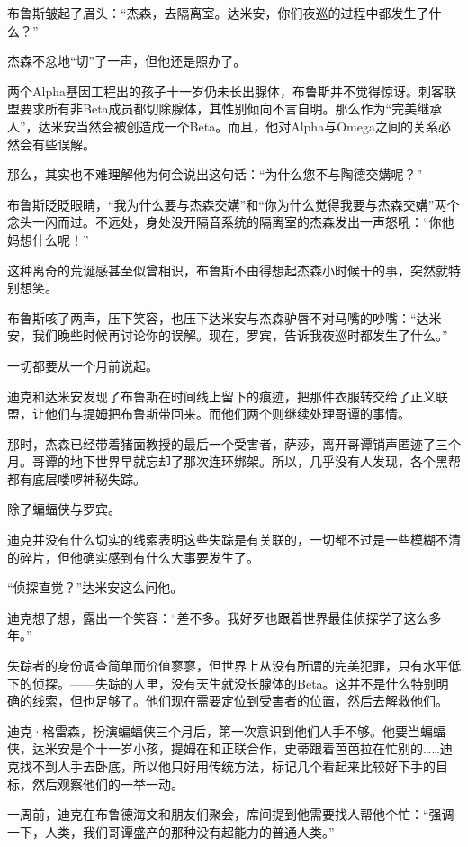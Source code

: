 \documentclass[../main]{subfiles}
\begin{document}
布鲁斯皱起了眉头：“杰森，去隔离室。达米安，你们夜巡的过程中都发生了什么？”

杰森不忿地“切”了一声，但他还是照办了。

两个Alpha基因工程出的孩子十一岁仍未长出腺体，布鲁斯并不觉得惊讶。刺客联盟要求所有非Beta成员都切除腺体，其性别倾向不言自明。那么作为“完美继承人”，达米安当然会被创造成一个Beta。而且，他对Alpha与Omega之间的关系必然会有些误解。

那么，其实也不难理解他为何会说出这句话：“为什么您不与陶德交媾呢？”

布鲁斯眨眨眼睛，“我为什么要与杰森交媾”和“你为什么觉得我要与杰森交媾”两个念头一闪而过。不远处，身处没开隔音系统的隔离室的杰森发出一声怒吼：“你他妈想什么呢！”

这种离奇的荒诞感甚至似曾相识，布鲁斯不由得想起杰森小时候干的事，突然就特别想笑。

布鲁斯咳了两声，压下笑容，也压下达米安与杰森驴唇不对马嘴的吵嘴：“达米安，我们晚些时候再讨论你的误解。现在，罗宾，告诉我夜巡时都发生了什么。”

一切都要从一个月前说起。

迪克和达米安发现了布鲁斯在时间线上留下的痕迹，把那件衣服转交给了正义联盟，让他们与提姆把布鲁斯带回来。而他们两个则继续处理哥谭的事情。

那时，杰森已经带着猪面教授的最后一个受害者，萨莎，离开哥谭销声匿迹了三个月。哥谭的地下世界早就忘却了那次连环绑架。所以，几乎没有人发现，各个黑帮都有底层喽啰神秘失踪。

除了蝙蝠侠与罗宾。

迪克并没有什么切实的线索表明这些失踪是有关联的，一切都不过是一些模糊不清的碎片，但他确实感到有什么大事要发生了。

“侦探直觉？”达米安这么问他。

迪克想了想，露出一个笑容：“差不多。我好歹也跟着世界最佳侦探学了这么多年。”

失踪者的身份调查简单而价值寥寥，但世界上从没有所谓的完美犯罪，只有水平低下的侦探。——失踪的人里，没有天生就没长腺体的Beta。这并不是什么特别明确的线索，但也足够了。他们现在需要定位到受害者的位置，然后去解救他们。

迪克·格雷森，扮演蝙蝠侠三个月后，第一次意识到他们人手不够。他要当蝙蝠侠，达米安是个十一岁小孩，提姆在和正联合作，史蒂跟着芭芭拉在忙别的……迪克找不到人手去卧底，所以他只好用传统方法，标记几个看起来比较好下手的目标，然后观察他们的一举一动。

一周前，迪克在布鲁德海文和朋友们聚会，席间提到他需要找人帮他个忙：“强调一下，人类，我们哥谭盛产的那种没有超能力的普通人类。”
\end{document}
